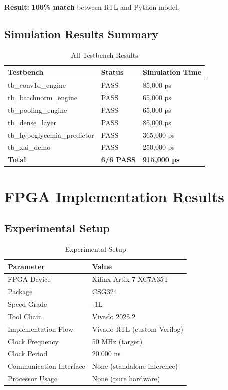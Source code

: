 \documentclass[11pt, a4paper]{article}
\begin{document}
\textbf{Result:} \textbf{100\% match} between RTL and Python model.

\subsection{Simulation Results Summary}

\begin{table}[H]
\centering
\caption{All Testbench Results}
\label{tab:sim_results}
\begin{tabular}{@{}lll@{}}
\toprule
\textbf{Testbench} & \textbf{Status} & \textbf{Simulation Time} \\ \midrule
tb\_conv1d\_engine & PASS & 85,000 ps \\
tb\_batchnorm\_engine & PASS & 65,000 ps \\
tb\_pooling\_engine & PASS & 65,000 ps \\
tb\_dense\_layer & PASS & 85,000 ps \\
tb\_hypoglycemia\_predictor & PASS & 365,000 ps \\
tb\_xai\_demo & PASS & 250,000 ps \\ \midrule
\textbf{Total} & \textbf{6/6 PASS} & \textbf{915,000 ps} \\ \bottomrule
\end{tabular}
\end{table}

\section{FPGA Implementation Results}

\subsection{Experimental Setup}

\begin{table}[H]
\centering
\caption{Experimental Setup}
\label{tab:setup}
\begin{tabular}{@{}ll@{}}
\toprule
\textbf{Parameter} & \textbf{Value} \\ \midrule
FPGA Device & Xilinx Artix-7 XC7A35T \\
Package & CSG324 \\
Speed Grade & -1L \\
Tool Chain & Vivado 2025.2 \\
Implementation Flow & Vivado RTL (custom Verilog) \\
Clock Frequency & 50 MHz (target) \\
Clock Period & 20.000 ns \\
Communication Interface & None (standalone inference) \\
Processor Usage & None (pure hardware) \\ \bottomrule
\end{tabular}
\end{table}
\end{document}
